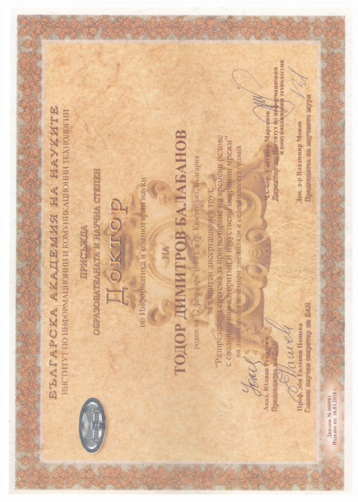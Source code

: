\documentclass[english,a4paper]{europasscv}
\begin{document}
\includegraphics[width=\textwidth,height=\textheight,keepaspectratio]{DiplomaIICT2018}
\end{document}

